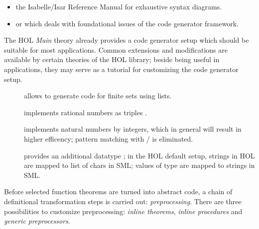 \begin{isabellebody}
\begin{isamarkuptext}
  \begin{itemize}

  \item the Isabelle/Isar Reference Manual \cite{isabelle-isar-ref}
    for exhaustive syntax diagrams.
  \item or \fixme[ref] which deals with foundational issues
    of the code generator framework.

  \end{itemize}%
\end{isamarkuptext}%
\isamarkuptrue%
%
\isamarkuptrue%
%
\begin{isamarkuptext}%
The HOL \emph{Main} theory already provides a code generator setup
  which should be suitable for most applications. Common extensions
  and modifications are available by certain theories of the HOL
  library; beside being useful in applications, they may serve
  as a tutorial for customizing the code generator setup.

  \begin{description}

    \item[] allows to generate code
       for finite sets using lists.
    \item[] \label{exec_rat} implements rational
       numbers as triples .
    \item[] \label{eff_nat} implements natural numbers by integers,
       which in general will result in higher efficency; pattern
       matching with  / 
       is eliminated.
    \item[] provides an additional datatype ;
       in the HOL default setup, strings in HOL are mapped to list
       of chars in SML; values of type  are
       mapped to strings in SML.

  \end{description}%
\end{isamarkuptext}%
\isamarkuptrue%
%
\isamarkuptrue%
%
\begin{isamarkuptext}%
Before selected function theorems are turned into abstract
  code, a chain of definitional transformation steps is carried
  out: \emph{preprocessing}. There are three possibilities
  to customize preprocessing: \emph{inline theorems},
  \emph{inline procedures} and \emph{generic preprocessors}.


\end{isamarkuptext}
\end{isabellebody}
